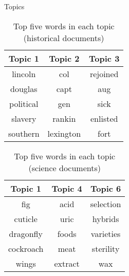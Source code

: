 \documentclass[final]{beamer}
\newlength{\onecolwid}
\newlength{\twocolwid}
\begin{document}
\begin{frame}[t]
\begin{columns}[t]
\begin{column}{\twocolwid}


\begin{columns}[t,totalwidth=\twocolwid] %

\begin{column}{\onecolwid} %


\begin{block}{Topics}

\begin{table}
\begin{tabular}{c c c}
\toprule
\textbf{Topic 1} & \textbf{Topic 2} & \textbf{Topic 3}\\
\midrule
 	lincoln      & col 	   		& rejoined \\
    douglas      & capt      	& aug      \\
    political    & gen    		& sick     \\
    slavery      & rankin      	& enlisted \\
    southern     & lexington    & fort     \\
\end{tabular}
\caption{Top five words in each topic (historical documents)}
\end{table}





\begin{table}
\begin{tabular}{c c c}
\toprule
\textbf{Topic 1} & \textbf{Topic 4} & \textbf{Topic 6} \\
\midrule
    fig 			& acid 		& selection  \\
    cuticle			& uric 		& hybrids   \\
    dragonfly 		& foods 	& varieties \\
    cockroach 		& meat 		& sterility \\
    wings 			& extract 	& wax        \\
\end{tabular}
\caption{Top five words in each topic (science documents)}
\end{table}


\end{block}
\end{column}
\end{columns}
\end{column}
\end{columns}
\end{frame}
\end{document}
